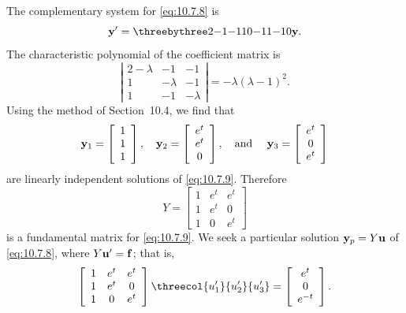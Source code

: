\begin{examplesolution}
 The complementary system for \eqref{eq:10.7.8} is
\begin{equation}
  \label{eq:10.7.9}{\bf y}'=\threebythree2{-1}{-1}10{-1}1{-1}0{\bf y}.
\end{equation}
The characteristic polynomial of the coefficient matrix is
\[
  \left|
  \begin{array}{ccc}
    2-\lambda & -1       & -1       \\
    1         & -\lambda & -1       \\
    1         & -1       & -\lambda
  \end{array}\right|= -\lambda(\lambda-1)^{2}.
\]
Using the method of Section~10.4, we find that
\[
  {\bf y}_{1}=\left[
  \begin{array}{c}
    1 \\
    1 \\
    1
  \end{array}\right],\quad{\bf y}_{2}=\left[
  \begin{array}{c}
    e^{t} \\
    e^{t} \\
    0
  \end{array}\right], \mbox{\quad and \quad}{\bf y}_{3}=\left[
  \begin{array}{c}
    e^{t} \\
    0     \\
    e^{t}
  \end{array}\right]
\]
are linearly independent solutions of \eqref{eq:10.7.9}. Therefore
\[
  Y=\left[
  \begin{array}{ccc}
    1 & e^{t} & e^{t} \\
    1 & e^{t} & 0     \\
    1 & 0     & e^{t}
  \end{array}\right]
\]
is a fundamental matrix for \eqref{eq:10.7.9}. We seek a particular solution ${\bf y}_{p}=Y{\bf u}$
of \eqref{eq:10.7.8}, where $Y{\bf u}'={\bf f}$; that is,
\[
  \left[
  \begin{array}{ccc}
    1 & e^{t} & e^{t} \\
    1 & e^{t} & 0     \\
    1 & 0     & e^{t}
  \end{array}\right] \threecol{u_{1}'}{u_{2}'}{u_{3}'}= \left[
  \begin{array}{c}
    e^{t}  \\
    0      \\
    e^{-t}
  \end{array}\right].
\]
\end{examplesolution}
